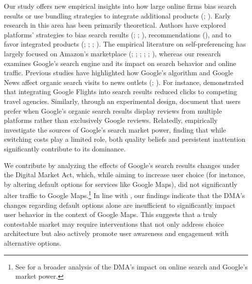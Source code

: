 \documentclass[11pt]{article}
\begin{document}
	Our study offers new empirical insights into how large online firms bias search results or use bundling strategies to integrate additional products (\citealp{prasad2010optimal}; \citealp{derdenger2013dynamic}). Early research in this area has been primarily theoretical. Authors have explored platforms' strategies to bias search results (\citealp{hagiu2011intermediaries}; \citealp{inderst2012competition}; \citealp{de2019model}), recommendations (\citealp{bourreau2022streaming}), and to favor integrated products (\citealp{carlton2010tie}; \citealp{anderson2021hybrid}; \citealp{hagiu2022should}; \citealp{zennyo2022platform}). The empirical literature on self-preferencing has largely focused on Amazon's marketplace (\citealp{gutierrez2021welfare}; \citealp{lam2021platform}; \citealp{lee2021entry}; \citealp{raval2022steering}; \citealp{farronato2023self}; \citealp{reimers2023framework}), whereas our research examines Google's search engine and its impact on search behavior and online traffic. Previous studies have highlighted how Google's algorithm and Google News affect organic search visits to news outlets (\citealp{athey2021impact}; \citealp{calzada2023search}). For instance, \cite{chiou2017vertical} demonstrated that integrating Google Flights into search results reduced clicks to competing travel agencies. Similarly, through an experimental design, \cite{kim2019product} document that users prefer when Google’s organic search results display reviews from multiple platforms rather than exclusively Google reviews. Relatedly, \cite{allcott2025sources} empirically investigate the sources of Google's search market power, finding that while switching costs play a limited role, both quality beliefs and persistent inattention significantly contribute to its dominance.
	
	
	We contribute by analyzing the effects of Google's search results changes under the Digital Market Act, which, while aiming to increase user choice (for instance, by altering default options for services like Google Maps), did not significantly alter traffic to Google Maps.\footnote{See \cite{decarolis2023regulating} for a broader analysis of the DMA's impact on online search and Google's market power.} In line with \cite{allcott2025sources}, our findings indicate that the DMA's changes regarding default options alone are insufficient to significantly impact user behavior in the context of Google Maps. This suggests that a truly contestable market may require interventions that not only address choice architecture but also actively promote user awareness and engagement with alternative options.
	
\end{document}
